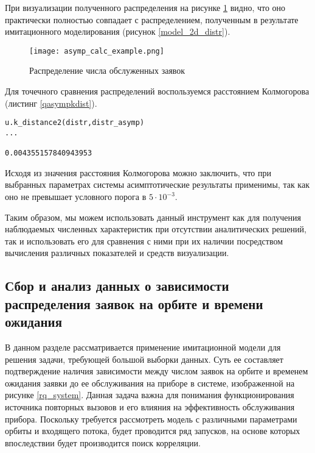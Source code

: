 При визуализации полученного распределения на рисунке \ref{asymp_calc_example} видно, что оно практически полностью совпадает с распределением, полученным в результате имитационного моделирования (рисунок \ref{model_2d_distr}).

\begin{figure}[H]
	\centering
	\texttt{[image: asymp\_calc\_example.png]}
	\caption{Распределение числа обслуженных заявок} 
	\label{asymp_calc_example}
\end{figure}

Для точечного сравнения распределений воспользуемся расстоянием Колмогорова (листинг \ref{qasympkdist}).

\begin{lstlisting}
u.k_distance2(distr,distr_asymp)
...

0.004355157840943953
\end{lstlisting}


Исходя из значения расстояния Колмогорова можно заключить, что при выбранных параметрах системы асимптотические результаты применимы, так как оно не превышает условного порога в $5\cdot 10^{-3}$.

Таким образом, мы можем использовать данный инструмент как для получения наблюдаемых численных характеристик при отсутствии аналитических решений, так и использовать его для сравнения с ними при их наличии посредством вычисления различных показателей и средств визуализации.

\subsection{Сбор и анализ данных о зависимости распределения заявок на орбите и времени ожидания}
В данном разделе рассматривается применение имитационной модели для решения задачи, требующей большой выборки данных. Суть ее составляет подтверждение наличия зависимости между числом заявок на орбите и временем ожидания заявки до ее обслуживания на приборе в системе, изображенной на рисунке \ref{rq_system}. Данная задача важна для понимания функционирования источника повторных вызовов и его влияния на эффективность обслуживания прибора. Поскольку требуется рассмотреть модель с различными параметрами орбиты и входящего потока, будет проводится ряд запусков, на основе которых впоследствии будет производится поиск корреляции.

